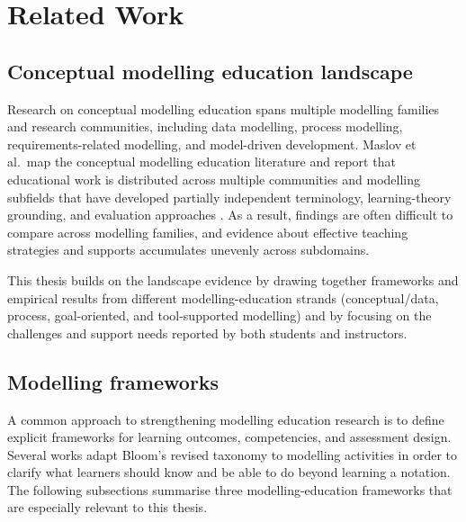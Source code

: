 
%

\chapter{Related Work}
\label{cha:related_work}

\section{Conceptual modelling education landscape}
\label{sec:rw_landscape}

Research on conceptual modelling education spans multiple modelling families and research communities, including data modelling, process modelling, requirements-related modelling, and model-driven development. Maslov et al.\ map the conceptual modelling education literature and report that educational work is distributed across multiple communities and modelling subfields that have developed partially independent terminology, learning-theory grounding, and evaluation approaches \cite{maslov2025conceptual}. As a result, findings are often difficult to compare across modelling families, and evidence about effective teaching strategies and supports accumulates unevenly across subdomains.

This thesis builds on the landscape evidence by drawing together frameworks and empirical results from different modelling-education strands (conceptual/data, process, goal-oriented, and tool-supported modelling) and by focusing on the challenges and support needs reported by both students and instructors.

\section{Modelling frameworks}
\label{sec:rw_frameworks}

A common approach to strengthening modelling education research is to define explicit frameworks for learning outcomes, competencies, and assessment design. Several works adapt Bloom's revised taxonomy \cite{krathwohl2002revision} to modelling activities in order to clarify what learners should know and be able to do beyond learning a notation. The following subsections summarise three modelling-education frameworks that are especially relevant to this thesis.

